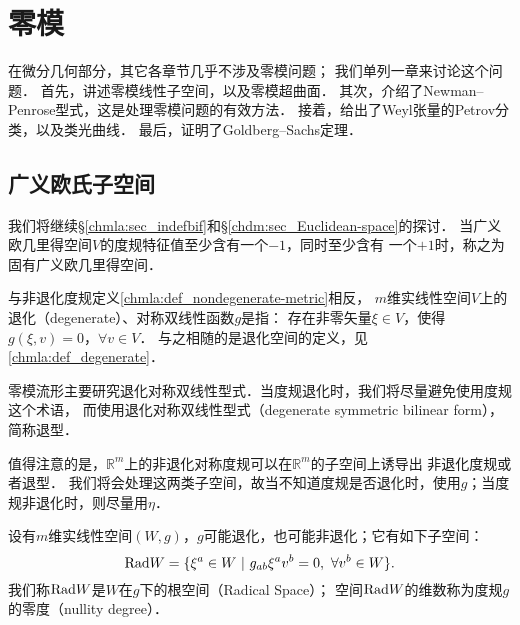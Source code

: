
\chapter{零模}\label{chnull}

在微分几何部分，其它各章节几乎不涉及零模问题；
我们单列一章来讨论这个问题．
首先，讲述零模线性子空间，以及零模超曲面．
其次，介绍了Newman--Penrose型式，这是处理零模问题的有效方法．
接着，给出了Weyl张量的Petrov分类，以及类光曲线．
最后，证明了Goldberg--Sachs定理．


\section{广义欧氏子空间}\label{chnull:sec_indef-algebra}


我们将继续\S\ref{chmla:sec_indefbif}和\S\ref{chdm:sec_Euclidean-space}的探讨．
当广义欧几里得空间$V$的度规特征值至少含有一个$-1$，同时至少含有
一个$+1$时，称之为{\heiti 固有广义欧几里得空间}．




与非退化度规定义\ref{chmla:def_nondegenerate-metric}相反，
$m$维实线性空间$V$上的退化（degenerate）、对称双线性函数$g$是指：
存在非零矢量$\xi \in V$，使得$g(\xi,v)=0$，$\forall v \in V$．
与之相随的是退化空间的定义，见\ref{chmla:def_degenerate}．

零模流形主要研究退化对称双线性型式．当度规退化时，我们将尽量避免使用度规这个术语，
而使用退化对称双线性型式（degenerate symmetric bilinear form），简称{\heiti 退型}．


值得注意的是，$\mathbb{R}^m$上的非退化对称度规可以在$\mathbb{R}^m$的子空间上诱导出
非退化度规或者{\kaishu 退型}．
我们将会处理这两类子空间，故当不知道度规是否退化时，使用$g$；当度规非退化时，则尽量用$\eta$．

\begin{definition}
    设有$m$维实线性空间$(W,g)$，$g$可能退化，也可能非退化；它有如下子空间：
    \begin{equation}
        {\rm Rad} W= \{\xi^a \in W \ |\  g_{ab} \xi^a v^b=0,\ \forall v^b\in W \} .
    \end{equation}
    我们称${\rm Rad} W$是$W$在$g$下的{\heiti 根空间}（Radical Space）；
    空间${\rm Rad} W$的维数称为度规$g$的{\heiti 零度}（nullity degree）．
\end{definition}

